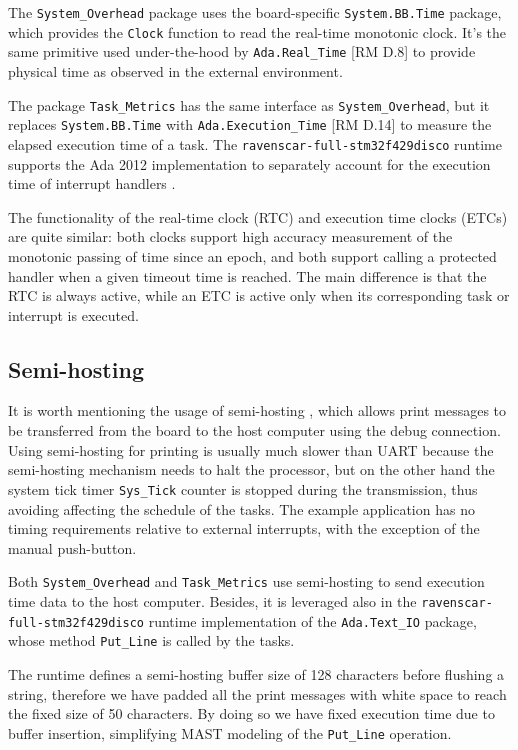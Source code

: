 \documentclass{article}
\begin{document}
The \texttt{System\_Overhead} package uses the board-specific \texttt{System.BB.Time} package, which provides the \texttt{Clock} function to read the real-time monotonic clock. It's the same primitive used under-the-hood by \texttt{Ada.Real\_Time} [RM D.8] to provide physical time as observed in the external environment.

The package \texttt{Task\_Metrics} has the same interface as \texttt{System\_Overhead}, but it replaces \texttt{System.BB.Time} with \texttt{Ada.Execution\_Time} [RM D.14] to measure the elapsed execution time of a task. The \texttt{ravenscar-full-stm32f429disco} runtime supports the Ada 2012 implementation to separately account for the execution time of interrupt handlers \cite{etc}.

The functionality of the real-time clock (RTC) and execution time clocks (ETCs) are quite similar: both clocks support high accuracy measurement of the monotonic passing of time since an epoch, and both support calling a protected handler when a given timeout time is reached. The main difference is that the RTC is always active, while an ETC is active only when its corresponding task or interrupt is executed.

\subsection{Semi-hosting}

It is worth mentioning the usage of semi-hosting \cite{semihosting}, which allows print messages to be transferred from the board to the host computer using the debug connection. Using semi-hosting for printing is usually much slower than UART because the semi-hosting mechanism needs to halt the processor, but on the other hand the system tick timer \texttt{Sys\_Tick} counter is stopped during the transmission, thus avoiding affecting the schedule of the tasks. The example application has no timing requirements relative to external interrupts, with the exception of the manual push-button.

Both \texttt{System\_Overhead} and \texttt{Task\_Metrics} use semi-hosting to send execution time data to the host computer. Besides, it is leveraged also in the \texttt{ravenscar-full-stm32f429disco} runtime implementation of the \texttt{Ada.Text\_IO} package, whose method \texttt{Put\_Line} is called by the tasks.

The runtime defines a semi-hosting buffer size of 128 characters before flushing a string, therefore we have padded all the print messages with white space to reach the fixed size of 50 characters. By doing so we have fixed execution time due to buffer insertion, simplifying MAST modeling of the \texttt{Put\_Line} operation.
\end{document}
